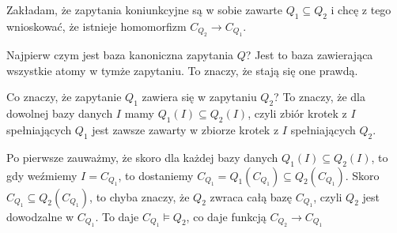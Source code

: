 \documentclass{article}
\begin{document}
\begin{solution}
  Zakładam, że zapytania koniunkcyjne są w sobie zawarte $Q_1\subseteq Q_2$ i chcę z tego wnioskować, że istnieje homomorfizm $C_{Q_2}\to C_{Q_1}$.

  Najpierw czym jest baza kanoniczna zapytania $Q$? Jest to baza zawierająca wszystkie atomy w tymże zapytaniu. To znaczy, że stają się one prawdą.

  Co znaczy, że zapytanie $Q_1$ zawiera się w zapytaniu $Q_2$? To znaczy, że dla dowolnej bazy danych $I$ mamy $Q_1(I)\subseteq Q_2(I)$, czyli zbiór krotek z $I$ spełniających $Q_1$ jest zawsze zawarty w zbiorze krotek z $I$ spełniających $Q_2$.

  Po pierwsze zauważmy, że skoro dla każdej bazy danych $Q_1(I)\subseteq Q_2(I)$, to gdy weźmiemy $I=C_{Q_1}$, to dostaniemy $C_{Q_1}=Q_1(C_{Q_1})\subseteq Q_2(C_{Q_1})$. Skoro $C_{Q_1}\subseteq Q_2(C_{Q_1})$, to chyba znaczy, że $Q_2$ zwraca całą bazę $C_{Q_1}$, czyli $Q_2$ jest dowodzalne w $C_{Q_1}$. To daje $C_{Q_1}\models Q_2$, co daje funkcją $C_{Q_2}\to C_{Q_1}$
\end{solution}
\end{document}
